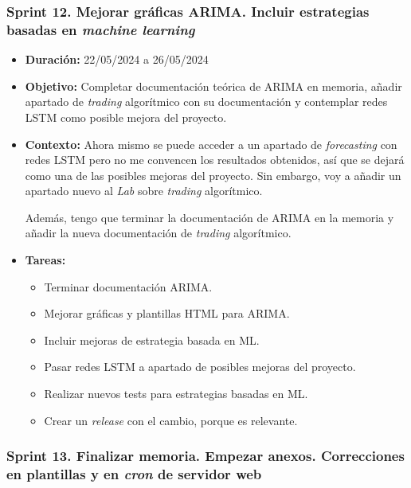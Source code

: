 \subsubsection{Sprint 12. Mejorar gráficas ARIMA. Incluir estrategias basadas en \emph{machine learning}}


\begin{itemize}
\item  
\textbf{Duración:} 22/05/2024 a 26/05/2024

\item
\textbf{Objetivo:} Completar documentación teórica de ARIMA en memoria, añadir apartado de \emph{trading} algorítmico con su documentación y contemplar redes LSTM como posible mejora del proyecto. 


\item
\textbf{Contexto:} Ahora mismo se puede acceder a un apartado de \emph{forecasting} con redes LSTM pero no me convencen los resultados obtenidos, así que se dejará como una de las posibles mejoras del proyecto. Sin embargo, voy a añadir un apartado nuevo al \emph{Lab} sobre \emph{trading} algorítmico. 

Además, tengo que terminar la documentación de ARIMA\citep{wiki:ARIMA} en la memoria y añadir la nueva documentación de \emph{trading} algorítmico. 


\item
\textbf{Tareas:}
	\begin{itemize}
	\tightlist
	\item 
	Terminar documentación ARIMA. 
	\item
	Mejorar gráficas y plantillas HTML para ARIMA.  
	\item
	Incluir mejoras de estrategia basada en ML. 
	\item
	Pasar redes LSTM a apartado de posibles mejoras del proyecto. 
	\item
	Realizar nuevos tests para estrategias basadas en ML.
	\item
	Crear un \emph{release} con el cambio, porque es relevante. 
  	\end{itemize}
\end{itemize}



\subsubsection{Sprint 13. Finalizar memoria. Empezar anexos. Correcciones en plantillas y en \emph{cron} de servidor web}

